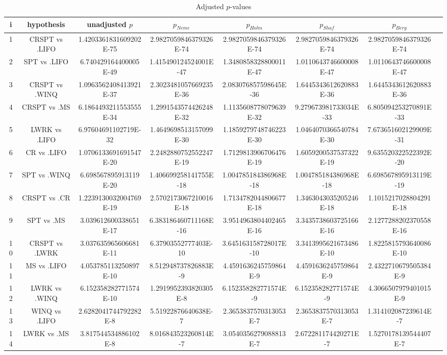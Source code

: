 \documentclass[a3paper,10pt]{article}
\begin{document}
\begin{table}[!htp]
\centering\tiny
\caption{Adjusted $p$-values}
\begin{tabular}{cccccccc}
i&hypothesis&unadjusted $p$&$p_{Neme}$&$p_{Holm}$&$p_{Shaf}$&$p_{Berg}$\\
\hline
1&CRSPT vs .LIFO&1.4203361831609202E-75&2.9827059846379326E-74&2.9827059846379326E-74&2.9827059846379326E-74&2.9827059846379326E-74\\
2&SPT vs .LIFO&6.740429164400005E-49&1.415490124524001E-47&1.3480858328800011E-47&1.0110643746600008E-47&1.0110643746600008E-47\\
3&CRSPT vs .WINQ&1.0963562408413921E-37&2.3023481057669235E-36&2.083076857598645E-36&1.6445343612620883E-36&1.6445343612620883E-36\\
4&CRSPT vs .MS&6.1864493211553555E-34&1.2991543574426248E-32&1.1135608778079639E-32&9.279673981733034E-33&6.805094253270891E-33\\
5&LWRK vs .LIFO&6.97604691102719E-32&1.4649698513157099E-30&1.1859279748746223E-30&1.0464070366540784E-30&7.673651602129909E-31\\
6&CR vs .LIFO&1.0706133691691547E-20&2.2482880752552247E-19&1.7129813906706476E-19&1.6059200537537322E-19&9.635520322522392E-20\\
7&SPT vs .WINQ&6.698567895913119E-20&1.406699258141755E-18&1.004785184386968E-18&1.004785184386968E-18&6.698567895913119E-19\\
8&CRSPT vs .CR&1.2239130032004769E-19&2.5702173067210016E-18&1.7134782044806677E-18&1.3463043035205246E-18&1.1015217028804291E-18\\
9&SPT vs .MS&3.039612600338651E-17&6.383186460711168E-16&3.9514963804402465E-16&3.3435738603725166E-16&2.1277288202370558E-16\\
10&CRSPT vs .LWRK&3.037635965606681E-11&6.37903552777403E-10&3.645163158728017E-10&3.3413995621673486E-10&1.8225815793640086E-10\\
11&MS vs .LIFO&4.053785113250897E-10&8.512948737826883E-9&4.4591636245759864E-9&4.4591636245759864E-9&2.4322710679505384E-9\\
12&LWRK vs .WINQ&6.152358282771574E-10&1.2919952393820305E-8&6.152358282771574E-9&6.152358282771574E-9&4.3066507979401015E-9\\
13&WINQ vs .LIFO&2.6282041744792282E-8&5.51922876640638E-7&2.3653837570313053E-7&2.3653837570313053E-7&1.314102087239614E-7\\
14&LWRK vs .MS&3.817544534886102E-8&8.016843523260814E-7&3.0540356279088813E-7&2.672281174420271E-7&1.5270178139544407E-7\\

\end{tabular}
\end{table}
\end{document}
